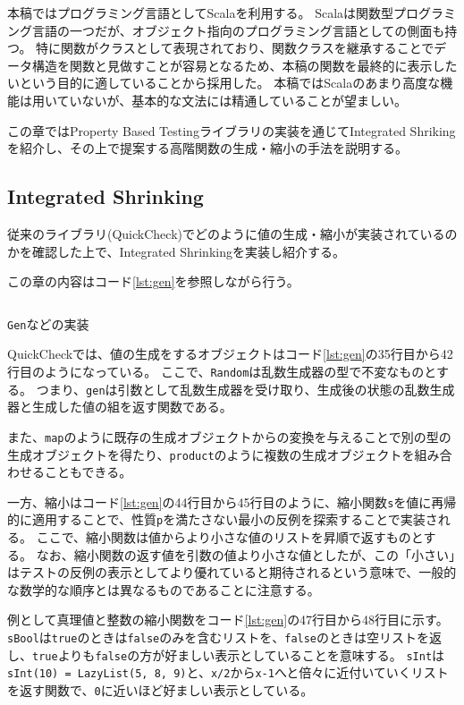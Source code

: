 \documentclass[submit,PRO]{ipsj}
\theoremstyle{definition}
\begin{document}
本稿ではプログラミング言語としてScala\cite{scala_online}を利用する。
Scalaは関数型プログラミング言語の一つだが、オブジェクト指向のプログラミング言語としての側面も持つ。
特に関数がクラスとして表現されており、関数クラスを継承することでデータ構造を関数と見做すことが容易となるため、本稿の関数を最終的に表示したいという目的に適していることから採用した。
本稿ではScalaのあまり高度な機能は用いていないが、基本的な文法には精通していることが望ましい。

この章ではProperty Based Testingライブラリの実装を通じてIntegrated Shrikingを紹介し、その上で提案する高階関数の生成・縮小の手法を説明する。

\subsection{Integrated Shrinking}

従来のライブラリ(QuickCheck\cite{claessen_quickcheck_2011})でどのように値の生成・縮小が実装されているのかを確認した上で、Integrated Shrinkingを実装し紹介する。

この章の内容はコード\ref{lst:gen}を参照しながら行う。

\begin{listing*}[hbt]
  \inputminted[breaklines,autogobble,linenos,firstline=35,lastline=76]{scala}{../src/main/scala/minicheck.scala}
  \caption{\texttt{Gen}などの実装}
  \label{lst:gen}
\end{listing*}

QuickCheckでは、値の生成をするオブジェクトはコード\ref{lst:gen}の35行目から42行目のようになっている。
ここで、\texttt{Random}は乱数生成器の型で不変なものとする。
つまり、\texttt{gen}は引数として乱数生成器を受け取り、生成後の状態の乱数生成器と生成した値の組を返す関数である。

また、\texttt{map}のように既存の生成オブジェクトからの変換を与えることで別の型の生成オブジェクトを得たり、\texttt{product}のように複数の生成オブジェクトを組み合わせることもできる。

一方、縮小はコード\ref{lst:gen}の44行目から45行目のように、縮小関数\texttt{s}を値に再帰的に適用することで、性質\texttt{p}を満たさない最小の反例を探索することで実装される。
ここで、縮小関数は値からより小さな値のリストを昇順で返すものとする。
なお、縮小関数の返す値を引数の値より小さな値としたが、この「小さい」はテストの反例の表示としてより優れていると期待されるという意味で、一般的な数学的な順序とは異なるものであることに注意する。

例として真理値と整数の縮小関数をコード\ref{lst:gen}の47行目から48行目に示す。
\texttt{sBool}は\texttt{true}のときは\texttt{false}のみを含むリストを、\texttt{false}のときは空リストを返し、\texttt{true}よりも\texttt{false}の方が好ましい表示としていることを意味する。
\texttt{sInt}は\texttt{sInt(10) = LazyList(5, 8, 9)}と、\texttt{x/2}から\texttt{x-1}へと倍々に近付いていくリストを返す関数で、\texttt{0}に近いほど好ましい表示としている。
\end{document}
